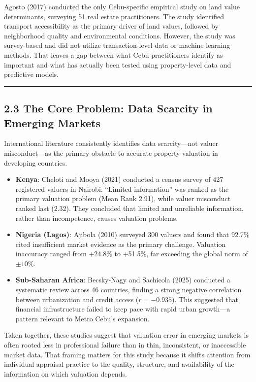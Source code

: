 Agosto (2017) conducted the only Cebu-specific empirical study on land value determinants, surveying 51 real estate practitioners. The study identified transport accessibility as the primary driver of land values, followed by neighborhood quality and environmental conditions. However, the study was survey-based and did not utilize transaction-level data or machine learning methods. That leaves a gap between what Cebu practitioners identify as important and what has actually been tested using property-level data and predictive models.

\begin{center}\rule{0.5\linewidth}{0.5pt}\end{center}

\subsection{\texorpdfstring{\textbf{2.3 The Core Problem: Data Scarcity in Emerging Markets}}{2.3 The Core Problem: Data Scarcity in Emerging Markets}}\label{the-core-problem-data-scarcity-in-emerging-markets}

International literature consistently identifies data scarcity---not valuer misconduct---as the primary obstacle to accurate property valuation in developing countries.

\begin{itemize}
\item \textbf{Kenya}: Cheloti and Mooya (2021) conducted a census survey of 427 registered valuers in Nairobi. ``Limited information'' was ranked as the primary valuation problem (Mean Rank 2.91), while valuer misconduct ranked last (2.32). They concluded that limited and unreliable information, rather than incompetence, causes valuation problems.
\item \textbf{Nigeria (Lagos)}: Ajibola (2010) surveyed 300 valuers and found that 92.7\% cited insufficient market evidence as the primary challenge. Valuation inaccuracy ranged from +24.8\% to +51.5\%, far exceeding the global norm of $\pm 10\%$.
\item \textbf{Sub-Saharan Africa}: Becsky-Nagy and Sachicola (2025) conducted a systematic review across 46 countries, finding a strong negative correlation between urbanization and credit access ($r = -0.935$). This suggested that financial infrastructure failed to keep pace with rapid urban growth---a pattern relevant to Metro Cebu's expansion.
\end{itemize}

Taken together, these studies suggest that valuation error in emerging markets is often rooted less in professional failure than in thin, inconsistent, or inaccessible market data. That framing matters for this study because it shifts attention from individual appraisal practice to the quality, structure, and availability of the information on which valuation depends.

